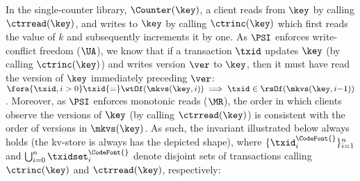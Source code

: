 In the single-counter library, $\Counter(\key)$, 
a client reads from $\key$ by calling $\ctrread(\key)$, and writes to $\key$ by calling $\ctrinc(\key)$ 
which first reads the value of $k$ and subsequently increments it by one.
As $\PSI$ enforces write-conflict freedom (\(\UA\)),
we know that if a transaction $\txid$ updates $\key$ (by calling $\ctrinc(\key)$) and writes version $\ver$ to $\key$, 
then it must have read the version of $\key$ immediately preceding $\ver$:
$\fora{\txid, i > 0} \txid {=} \wtOf(\mkvs(\key, i)) \implies \txid \in \rsOf(\mkvs(\key, i{-}1))$. 
Moreover, as $\PSI$ enforces monotonic reads ($\MR$),
the order in which clients observe the versions of $\key$ (by calling $\ctrread(\key)$)
is consistent with the order of versions in $\mkvs(\key)$. 
As such, the invariant illustrated below always holds (\ie the kv-store is always has the depicted shape), where  
$\{\txid^{\CodeFont{}}_{i}\}_{i=1}^{n}$ and $\bigcup_{i=0}^{n} \txidset^{\CodeFont{}}_{i}$ 
denote disjoint sets of transactions calling $\ctrinc(\key)$ and $\ctrread(\key)$, respectively:
%
